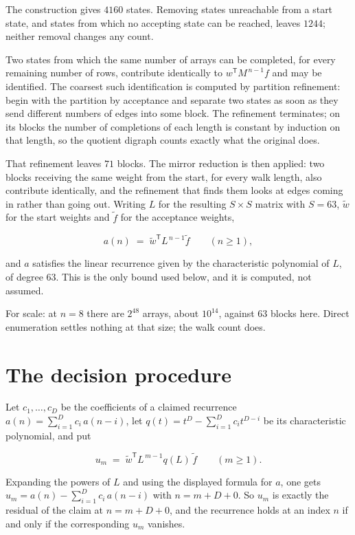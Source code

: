\documentclass[11pt]{article}
\theoremstyle{definition}
\begin{document}
The construction gives $4160$ states. Removing states unreachable from a start state, and states from which no accepting state can be reached, leaves $1244$; neither removal changes any count.

Two states from which the same number of arrays can be completed, for every remaining number of rows, contribute identically to $w^{\mathsf T}M^{\,n-1}f$ and may be identified. The coarsest such identification is computed by partition refinement: begin with the partition by acceptance and separate two states as soon as they send different numbers of edges into some block. The refinement terminates; on its blocks the number of completions of each length is constant by induction on that length, so the quotient digraph counts exactly what the original does.

That refinement leaves $71$ blocks. The mirror reduction is then applied: two blocks receiving the same weight from the start, for every walk length, also contribute identically, and the refinement that finds them looks at edges coming in rather than going out. Writing $L$ for the resulting $S \times S$ matrix with $S = 63$, $\tilde w$ for the start weights and $\tilde f$ for the acceptance weights,

\[a(n) \;=\; \tilde w^{\mathsf T} L^{\,n-1} \tilde f \qquad (n \ge 1),\]

and $a$ satisfies the linear recurrence given by the characteristic polynomial of $L$, of degree $63$. This is the only bound used below, and it is computed, not assumed.

For scale: at $n = 8$ there are $2^{48}$ arrays, about $10^{14}$, against $63$ blocks here. Direct enumeration settles nothing at that size; the walk count does.

\section{The decision procedure}

Let $c_1,\dots,c_D$ be the coefficients of a claimed recurrence $a(n) = \sum_{i=1}^{D} c_i\,a(n-i)$, let $q(t) = t^{D} - \sum_{i=1}^{D} c_i t^{D-i}$ be its characteristic polynomial, and put

\[u_m \;=\; \tilde w^{\mathsf T} L^{\,m-1} q(L)\,\tilde f \qquad (m \ge 1).\]

Expanding the powers of $L$ and using the displayed formula for $a$, one gets $u_m = a(n) - \sum_{i=1}^{D} c_i\,a(n-i)$ with $n = m + D + 0$. So $u_m$ is exactly the residual of the claim at $n = m + D + 0$, and the recurrence holds at an index $n$ if and only if the corresponding $u_m$ vanishes.
\end{document}
